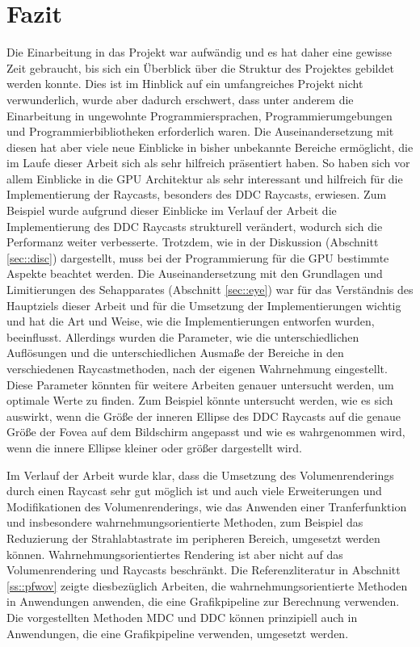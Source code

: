 \chapter{Fazit}\label{chap:zusfas}
Die Einarbeitung in das Projekt war aufwändig und es hat daher eine gewisse Zeit gebraucht, bis sich ein Überblick über die Struktur des Projektes gebildet werden konnte.
Dies ist im Hinblick auf ein umfangreiches Projekt nicht verwunderlich, wurde aber dadurch erschwert, dass unter anderem die Einarbeitung in ungewohnte Programmiersprachen, Programmierumgebungen und Programmierbibliotheken erforderlich waren.
Die Auseinandersetzung mit diesen hat aber viele neue Einblicke in bisher unbekannte Bereiche ermöglicht, die im Laufe dieser Arbeit sich als sehr hilfreich präsentiert haben.
So haben sich vor allem Einblicke in die GPU Architektur als sehr interessant und hilfreich für die Implementierung der Raycasts, besonders des DDC Raycasts, erwiesen.
Zum Beispiel wurde aufgrund dieser Einblicke im Verlauf der Arbeit die Implementierung des DDC Raycasts strukturell verändert, wodurch sich die Performanz weiter verbesserte.
Trotzdem, wie in der Diskussion (Abschnitt \ref{sec::disc}) dargestellt, muss bei der Programmierung für die GPU bestimmte Aspekte beachtet werden.
Die Auseinandersetzung mit den Grundlagen und Limitierungen des Sehapparates (Abschnitt \ref{sec::eye}) war für das Verständnis des Hauptziels dieser Arbeit und für die Umsetzung der Implementierungen wichtig und hat die Art und Weise, wie die Implementierungen entworfen wurden, beeinflusst.
Allerdings wurden die Parameter, wie die unterschiedlichen Auflösungen und die unterschiedlichen Ausmaße der Bereiche in den verschiedenen Raycastmethoden, nach der eigenen Wahrnehmung eingestellt.
Diese Parameter könnten für weitere Arbeiten genauer untersucht werden, um optimale Werte zu finden.
Zum Beispiel könnte untersucht werden, wie es sich auswirkt, wenn die Größe der inneren Ellipse des DDC Raycasts auf die genaue Größe der Fovea auf dem Bildschirm angepasst und wie es wahrgenommen wird, wenn die innere Ellipse kleiner oder größer dargestellt wird.

Im Verlauf der Arbeit wurde klar, dass die Umsetzung des Volumenrenderings durch einen Raycast sehr gut möglich ist und auch viele Erweiterungen und Modifikationen des Volumenrenderings, wie das Anwenden einer Tranferfunktion und insbesondere wahrnehmungsorientierte Methoden, zum Beispiel das Reduzierung der Strahlabtastrate im peripheren Bereich, umgesetzt werden können.
Wahrnehmungsorientiertes Rendering ist aber nicht auf das Volumenrendering und Raycasts beschränkt.
Die Referenzliteratur in Abschnitt \ref{ss::pfwov} zeigte diesbezüglich Arbeiten, die wahrnehmungsorientierte Methoden in Anwendungen anwenden, die eine Grafikpipeline zur Berechnung verwenden.
Die vorgestellten Methoden MDC und DDC können prinzipiell auch in Anwendungen, die eine Grafikpipeline verwenden, umgesetzt werden.

